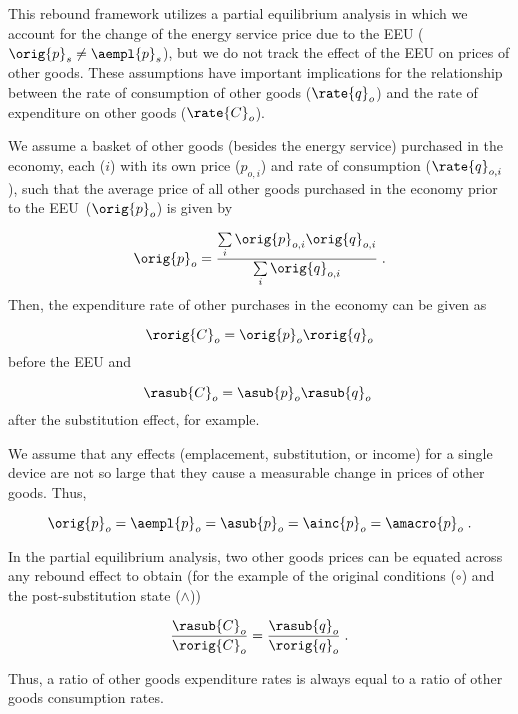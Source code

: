

This rebound framework utilizes
a partial equilibrium analysis
in which we account for the change of the energy service price
due to the EEU ($\orig{p}_s \neq \aempl{p}_s$), but 
we do not track the effect of the EEU on prices of other goods.
These assumptions have important implications for the relationship between 
the rate of consumption of other goods ($\rate{q}_o$) and 
the rate of expenditure on other goods ($\rate{C}_o$).

We assume a basket of other goods (besides the energy service) 
purchased in the economy,
each ($i$) with its own price ($p_{o,i}$) and rate of consumption ($\rate{q}_{o,i}$),
such that the average price of all other goods purchased in the economy
prior to the EEU~($\orig{p}_o$) is given by

\begin{equation}
  \orig{p}_o = \frac{\sum\limits_i \orig{p}_{o,i} \orig{q}_{o,i}}{\sum\limits_i \orig{q}_{o,i}} \; .
\end{equation}
%
Then, the expenditure rate of other purchases in the economy can be given as

\begin{equation}
  \rorig{C}_o = \orig{p}_o \rorig{q}_o
\end{equation}
%
before the EEU and

\begin{equation}
  \rasub{C}_o = \asub{p}_o \rasub{q}_o \; 
\end{equation}
%
after the substitution effect, for example.

We assume that any effects (emplacement, substitution, or income)
for a single device 
are not so large that they 
cause a measurable change in prices of other goods. 
Thus, 

\begin{equation}
  \orig{p}_o = \aempl{p}_o = \asub{p}_o = \ainc{p}_o = \amacro{p}_o \; .
\end{equation}

In the partial equilibrium analysis, 
two other goods prices can be equated 
across any rebound effect
to obtain
(for the example of the original conditions ($\circ$) 
and the post-substitution state ($\wedge$))

\begin{equation} \label{eq:qo_Co_equality}
  \frac{\rasub{C}_o}{\rorig{C}_o} 
      = \frac{\rasub{q}_o}{\rorig{q}_o} \; .
\end{equation}

Thus, a ratio of other goods expenditure rates
is always equal to a ratio of other goods consumption rates.










